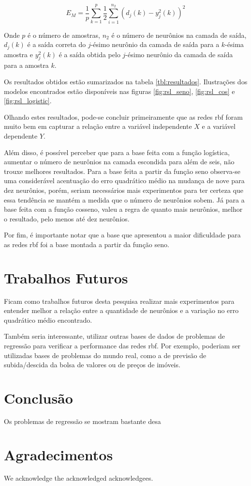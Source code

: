 \documentclass[conference]{IEEEtran}
\begin{document}
$$E_{M} = \frac{1}{p}\sum_{k=1}^{p}\frac{1}{2}\sum_{i=1}^{n_{2}}
(d_{j}(k)-y_{j}^{2}(k))^{2}$$

Onde $p$ é o número de amostras, $n_{2}$ é o número de neurônios na camada de 
saída, $d_{j}(k)$ é a saída correta do $j$-ésimo neurônio da camada de saída 
para a $k$-ésima amostra  e $y_{j}^{2}(k)$ é a saída obtida pelo $j$-ésimo 
neurônio da camada de saída para a amostra $k$.

Os resultados obtidos estão sumarizados na tabela \ref{tbl:resultados}. 
Ilustrações dos modelos encontrados estão disponíveis nas figuras 
\ref{fig:rsl_seno}, \ref{fig:rsl_cos} e \ref{fig:rsl_logistic}.

Olhando estes resultados, pode-se concluir primeiramente que as redes \ac*{rbf} 
foram muito bem em capturar a relação entre a variável independente $X$ e a 
variável dependente $Y$.

Além disso, é possível perceber que para a base feita com a função logística, 
aumentar o número de neurônios na camada escondida para além de seis, não trouxe 
melhores resultados. Para a base feita a partir da função seno observa-se uma 
considerável acentuação do erro quadrático médio na mudança de nove para dez 
neurônios, porém, seriam necessários mais experimentos para ter certeza que 
essa tendência se mantém a medida que o número de neurônios sobem. Já para a 
base feita com a função cosseno, valeu a regra de quanto mais neurônios, 
melhor o resultado, pelo menos até dez neurônios.

Por fim, é importante notar que a base que apresentou a maior dificuldade para 
as redes \ac*{rbf} foi a base montada a partir da função seno.

\section{Trabalhos Futuros}
\label{trabalhos_futuros}

Ficam como trabalhos futuros desta pesquisa realizar mais experimentos para 
entender melhor a relação entre a quantidade de neurônios e a variação no erro 
quadrático médio encontrado.

Também seria interessante, utilizar outras bases de dados de problemas de 
regressão para verificar a performance das redes \ac*{rbf}. Por exemplo, 
poderiam ser utilizadas bases de problemas do mundo real, como a de previsão 
de subida/descida da bolsa de valores ou de preços de imóveis.

\section{Conclusão}
\label{conclusao}

Os problemas de regressão se mostram bastante desa

\section*{Agradecimentos}
We acknowledge the acknowledged acknowledgees.




\end{document}
